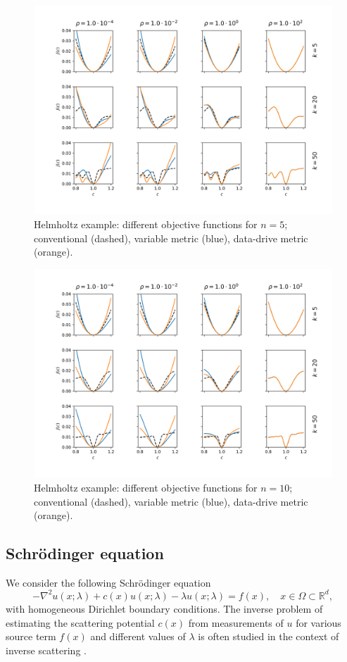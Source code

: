 \documentclass[12pt]{amsart}
\begin{document}
\begin{figure}
\includegraphics[scale=.5]{figures/Helmholtz1D_5.png}
\caption{Helmholtz example: different objective functions for $n=5$; conventional (dashed), variable metric (blue), data-drive metric (orange).}\label{fig:helmholtz1db}
\end{figure}

\begin{figure}
\includegraphics[scale=.5]{figures/Helmholtz1D_10.png}
\caption{Helmholtz example: different objective functions for $n=10$; conventional (dashed), variable metric (blue), data-drive metric (orange).}\label{fig:helmholtz1dc}
\end{figure}
\subsection{Schr{\"o}dinger equation}
We consider the following Schr{\"o}dinger equation
\begin{equation}\label{eq:sch_eqn}
-\nabla^2 u(x;\lambda) + c(x)u(x;\lambda) - \lambda u(x;\lambda) = f(x), \quad x \in \Omega\subset{\mathbb{R}^d},
\end{equation}
with homogeneous Dirichlet boundary conditions. The inverse problem of estimating the scattering potential $c(x)$ from measurements of $u$ for various source term $f(x)$ and different values of $\lambda$ is often studied in the context of inverse scattering \cite{imanuvilov2012inverse,Novikov2022}.
\end{document}
